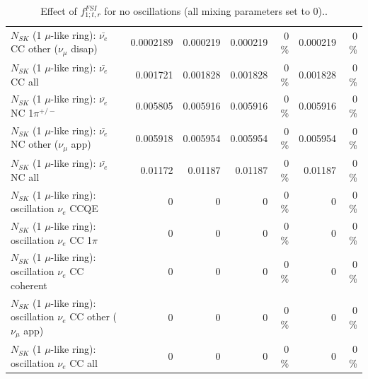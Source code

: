 \begin{table}
\begin{tabular}{| l | r | r | r  r | r  r |}
          $N_{SK}$ (1 $\mu$-like ring): $\bar{\nu_e}$ CC other ($\nu_\mu$ disap) &       0.0002189 &        0.000219 &        0.000219 &        0 \%  &        0.000219 &        0 \%  \\ 
                            $N_{SK}$ (1 $\mu$-like ring): $\bar{\nu_{e}}$ CC all &        0.001721 &        0.001828 &        0.001828 &        0 \%  &        0.001828 &        0 \%  \\ 
\hline
                     $N_{SK}$ (1 $\mu$-like ring): $\bar{\nu_e}$ NC 1$\pi^{+/-}$ &        0.005805 &        0.005916 &        0.005916 &        0 \%  &        0.005916 &        0 \%  \\ 
            $N_{SK}$ (1 $\mu$-like ring): $\bar{\nu_e}$ NC other ($\nu_\mu$ app) &        0.005918 &        0.005954 &        0.005954 &        0 \%  &        0.005954 &        0 \%  \\ 
                            $N_{SK}$ (1 $\mu$-like ring): $\bar{\nu_{e}}$ NC all &         0.01172 &         0.01187 &         0.01187 &        0 \%  &         0.01187 &        0 \%  \\ 
\hline
\hline
\hline
                          $N_{SK}$ (1 $\mu$-like ring): oscillation $\nu_e$ CCQE &               0 &               0 &               0 &        0 \%  &               0 &        0 \%  \\ 
                     $N_{SK}$ (1 $\mu$-like ring): oscillation $\nu_e$ CC 1$\pi$ &               0 &               0 &               0 &        0 \%  &               0 &        0 \%  \\ 
                   $N_{SK}$ (1 $\mu$-like ring): oscillation $\nu_e$ CC coherent &               0 &               0 &               0 &        0 \%  &               0 &        0 \%  \\ 
      $N_{SK}$ (1 $\mu$-like ring): oscillation $\nu_e$ CC other ($\nu_\mu$ app) &               0 &               0 &               0 &        0 \%  &               0 &        0 \%  \\ 
                       $N_{SK}$ (1 $\mu$-like ring): oscillation $\nu_e$  CC all &               0 &               0 &               0 &        0 \%  &               0 &        0 \%  \\ 
\hline
\hline
\end{tabular}
\caption{ Effect of $f_{1; t, r}^{FSI}$ for no oscillations (all mixing parameters set to 0).. }
\label{tab:num_fsi_001_1RmuT_3f_osc_t13:0_spectralreco_spectraltrue}
\end{table}
\clearpage

